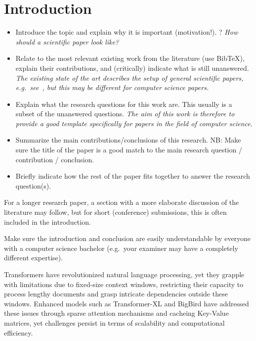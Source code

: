 \section{Introduction}
\begin{itemize}
\item Introduce the topic and explain why it is important (motivation!). ?
\emph{How should a scientific paper look like?}

\item Relate to the most relevant existing work from the literature (use BibTeX), explain their contributions, and (critically) indicate what is still unanswered. 
\emph{The existing state of the art describes the setup of general scientific papers, e.g.\ see~\cite{hengl2002rules}, but this may be different for computer science papers.}

\item Explain what the research questions for this work are. 
This usually is a subset of the unanswered questions. 
\emph{The aim of this work is therefore to provide a good template specifically for papers in the field of computer science.}

\item Summarize the main contributions/conclusions of this research.
NB: Make sure the title of the paper is a good match to the main research question / contribution / conclusion.

\item Briefly indicate how the rest of the paper fits together to answer the research question(s).
\end{itemize}

For a longer research paper, a section with a more elaborate discussion of the literature may follow, but for short (conference) submissions, this is often included in the introduction.

Make sure the introduction and conclusion are easily understandable by everyone with a computer science bachelor (e.g.\ your examiner may have a completely different expertise).


Transformers have revolutionized natural language processing, yet they grapple with limitations due to fixed-size context windows,
 restricting their capacity to process lengthy documents and grasp intricate dependencies outside these windows.
  Enhanced models such as Transformer-XL and BigBird have addressed these issues through sparse attention mechanisms and cacheing Key-Value matrices,
   yet challenges persist in terms of scalability and computational efficiency. 

